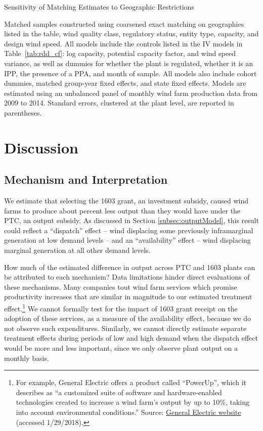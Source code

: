 \documentclass[12pt]{article}
\begin{document}
\begin{table}[H]
\begin{center}
\caption{Sensitivity of Matching Estimates to Geographic Restrictions \label{tab:matching_table_cf}}

\end{center}
\footnotesize
Matched samples constructed using coarsened exact matching on geographies listed in the table, wind quality class, regulatory status, entity type, capacity, and design wind speed. All models include the controls listed in the IV models in Table~\ref{tab:rdd_cf}: log capacity, potential capacity factor, and wind speed variance, as well as dummies for whether the plant is regulated, whether it is an IPP, the presence of a PPA, and month of sample. All models also include cohort dummies, matched group-year fixed effects, and state fixed effects. Models are estimated using an unbalanced panel of monthly wind farm production data from 2009 to 2014. Standard errors, clustered at the plant level, are reported in parentheses.
\end{table}

\section{Discussion \label{sec:Discussion}}


\subsection{Mechanism and Interpretation \label{sec:Mechanism}}

We estimate that selecting the 1603 grant, an investment subsidy, caused wind farms to produce about percent less output than they would have under the PTC, an output subsidy. As discussed in Section \ref{subsec:outputModel}, this result could reflect a ``dispatch'' effect -- wind displacing some previously inframarginal generation at low demand levels -- and an ``availability'' effect -- wind displacing marginal generation at all other demand levels.

How much of the estimated difference in output across PTC and 1603 plants can be attributed to each mechanism? Data limitations hinder direct evaluations of these mechanisms. Many companies tout wind farm services which promise productivity increases that are similar in magnitude to our estimated treatment effect.\footnote{For example, General Electric offers a product called ``PowerUp'', which it describes as ``a customized suite of software and hardware-enabled technologies created to increase a wind farm's output by up to 10\%, taking into account environmental conditions.'' Source: \href{https://www.gerenewableenergy.com/wind-energy/turbine-services/platform-upgrades}{General Electric website} (accessed 1/29/2018).} We cannot formally test for the impact of 1603 grant receipt on the adoption of these services, as a measure of the availability effect, because we do not observe such expenditures. Similarly, we cannot directly estimate separate treatment effects during periods of low and high demand when the dispatch effect would be more and less important, since we only observe plant output on a monthly basis.
\end{document}
